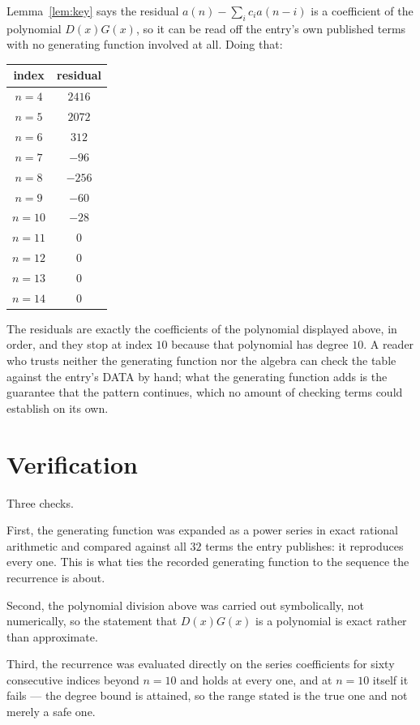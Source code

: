 \documentclass[11pt,a4paper]{article}
\theoremstyle{plain}
\theoremstyle{definition}
\begin{document}
Lemma~\ref{lem:key} says the residual $a(n)-\sum_ic_ia(n-i)$ is a coefficient of the
polynomial $D(x)G(x)$, so it can be read off the entry's own published terms with no
generating function involved at all. Doing that:
\begin{center}
\begin{tabular}{cc}
index & residual \\ \hline
$n=4$ & $2416$ \\
$n=5$ & $2072$ \\
$n=6$ & $312$ \\
$n=7$ & $-96$ \\
$n=8$ & $-256$ \\
$n=9$ & $-60$ \\
$n=10$ & $-28$ \\
$n=11$ & $0$ \\
$n=12$ & $0$ \\
$n=13$ & $0$ \\
$n=14$ & $0$
\end{tabular}
\end{center}
The residuals are exactly the coefficients of the polynomial displayed above, in order, and
they stop at index $10$ because that polynomial has degree $10$. A reader who trusts
neither the generating function nor the algebra can check the table against the entry's DATA
by hand; what the generating function adds is the guarantee that the pattern continues, which
no amount of checking terms could establish on its own.

\section{Verification}

Three checks.

First, the generating function was expanded as a power series in exact rational arithmetic and
compared against all $32$ terms the entry publishes: it reproduces every one. This is
what ties the recorded generating function to the sequence the recurrence is about.

Second, the polynomial division above was carried out symbolically, not numerically, so the
statement that $D(x)G(x)$ is a polynomial is exact rather than approximate.

Third, the recurrence was evaluated directly on the series coefficients for sixty consecutive
indices beyond $n=10$ and holds at every one, and at $n=10$ itself it fails --- the
degree bound is attained, so the range stated is the true one and not merely a safe one.
\end{document}
